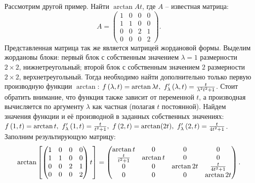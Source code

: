 		Рассмотрим другой пример. Найти $\arctan{At}$, где $A$ -- известная матрица:
		\[ A = \begin{pmatrix} 1 & 0 & 0 & 0 \\ 1 & 1 & 0 & 0 \\ 0 & 0 & 2 & 1 \\ 0 & 0 & 0 & 2 \end{pmatrix}. \]
		Представленная матрица так же является матрицей жордановой формы. Выделим жордановы блоки: первый блок с собственным значением $\lambda = 1$ размерности $2 \times 2$, нижнетреугольный; второй блок с собственным значением $2$ размерности $2 \times 2$, верхнетреугольный. Тогда необходимо найти дополнительно только первую производную функции $\arctan$: $f\left( \lambda, t \right) = \arctan{\lambda t}, ~ f'_{\lambda} \left( \lambda, t \right) = \frac{t}{\lambda^2 t^2 + 1}$. Стоит обратить внимание, что функция также зависит от переменной $t$, а производная вычисляется по аргументу $\lambda$ как частная (полагая $t$ постоянной). Найдем значения функции и её производной в заданных собственных значениях: $f\left( 1, t \right) = \arctan{t}, ~ f'_{\lambda}\left( 1, t \right) = \frac{t}{t^2 + 1}, ~ f\left( 2, t \right) = \arctan(2t), ~ f'_{\lambda}\left( 2, t \right) = \frac{t}{4t^2 + 1}$. Заполним результирующую матрицу:
		\[ \arctan\left[ \begin{pmatrix} 1 & 0 & 0 & 0 \\ 1 & 1 & 0 & 0 \\ 0 & 0 & 2 & 1 \\ 0 & 0 & 0 & 2 \end{pmatrix} t \right] = \begin{pmatrix} \arctan{t} & 0 & 0 & 0 \\ \frac{t}{t^2 + 1} & \arctan{t} & 0 & 0 \\ 0 & 0 & \arctan{2t} & \frac{t}{4t^2 + 1} \\ 0 & 0 & 0 & \arctan{2t} \end{pmatrix}. \]
